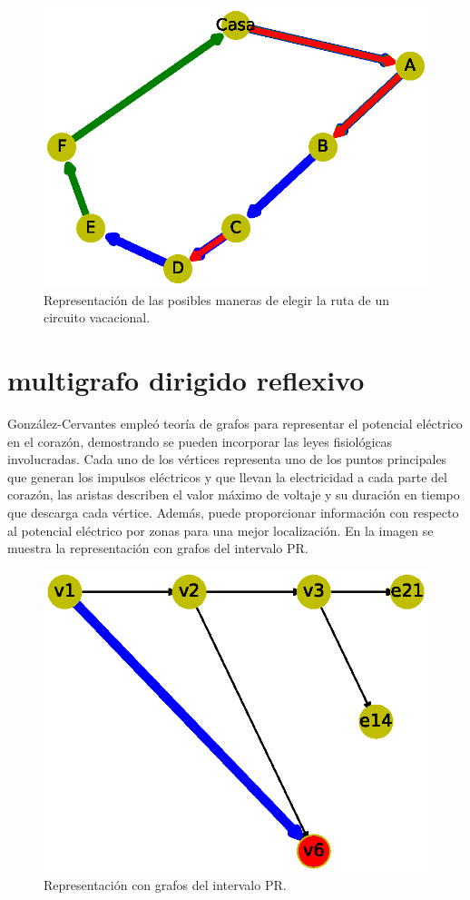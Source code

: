 \documentclass{article}
\begin{document}

\begin{figure}
  \includegraphics[width=.8\columnwidth]{11.eps}
  \caption{Representación de las posibles maneras de elegir la ruta de un circuito vacacional.}
  \label{fig:11}
\end{figure}




\section{multigrafo dirigido reflexivo}
González-Cervantes \cite{gonzalez2016potencial} empleó teoría de grafos para representar el potencial eléctrico en el corazón, demostrando se pueden incorporar las leyes fisiológicas involucradas. Cada uno de los vértices representa uno de los puntos principales que generan los impulsos eléctricos y que llevan la electricidad a
cada parte del corazón, las aristas describen el valor máximo de voltaje y su
duración en tiempo que descarga cada vértice. Además, puede proporcionar información con respecto al potencial eléctrico por zonas para una mejor localización.
En la imagen se muestra la representación con grafos del intervalo PR.

\begin{figure}
  \centering 
  \includegraphics[width=.8\columnwidth]{12.eps}
  \caption{Representación con grafos del intervalo PR.}
  \label{fig:12}
\end{figure}


\newpage


\end{document}
